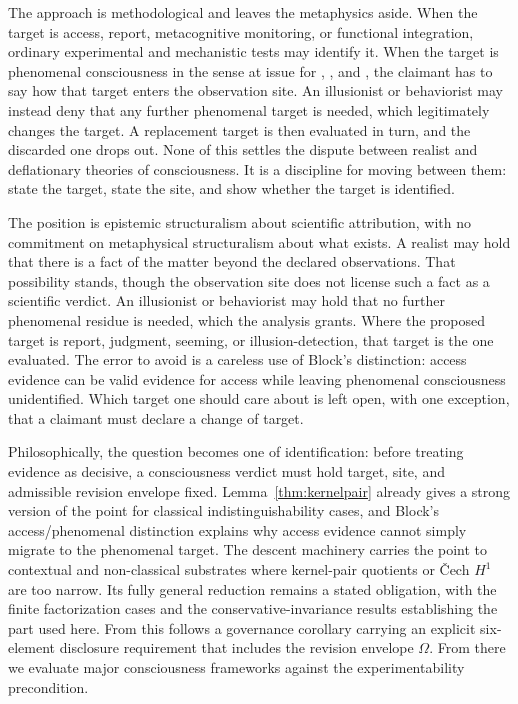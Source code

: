 \documentclass[11pt]{article}
\begin{document}
The approach is methodological and leaves the metaphysics aside. When the
target is access, report, metacognitive monitoring, or functional integration,
ordinary experimental and mechanistic tests may identify it. When the target is
phenomenal consciousness in the sense at issue for \citet{nagel1974},
\citet{levine1983}, and \citet{chalmers1995}, the claimant has to say how that
target enters the observation site. An illusionist or behaviorist may instead
deny that any further phenomenal target is needed, which legitimately changes the
target. A replacement target is then evaluated in turn, and the discarded one
drops out. None of this settles the dispute between realist and
deflationary theories of consciousness. It is a discipline for moving
between them: state the target, state the
site, and show whether the target is identified.

The position is epistemic structuralism about scientific attribution, with no
commitment on metaphysical structuralism about what exists. A realist may hold
that there is a fact of the matter beyond the declared observations. That
possibility stands, though the observation site does not license such a fact as a
scientific verdict. An illusionist or behaviorist may hold that no further
phenomenal residue is needed, which the analysis grants. Where the proposed
target is report, judgment, seeming, or illusion-detection, that target is the
one evaluated. The error to avoid is a careless use of Block's distinction: access
evidence can be valid evidence for access while leaving phenomenal consciousness
unidentified. Which target one should care about is left open, with one
exception, that a claimant must declare a change of target.

Philosophically, the question becomes one of identification: before treating
evidence as decisive, a consciousness verdict must hold target, site, and
admissible revision envelope fixed. Lemma~\ref{thm:kernelpair} already gives a
strong version of the point for classical indistinguishability cases, and
Block's access/phenomenal distinction explains why access evidence cannot simply
migrate to the phenomenal target. The descent machinery carries the point to
contextual and non-classical substrates where kernel-pair quotients or
\v{C}ech $H^1$ are too narrow. Its fully general reduction remains a stated
obligation, with the finite factorization cases and the conservative-invariance
results establishing the part used here. From this follows a governance
corollary carrying an explicit six-element disclosure requirement that includes
the revision envelope $\Omega$. From there we evaluate major consciousness
frameworks against the experimentability precondition.
\end{document}
